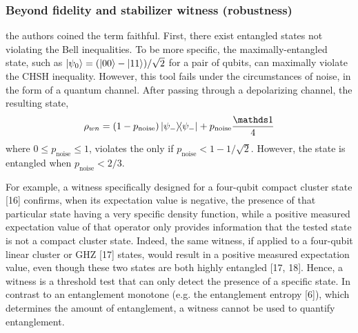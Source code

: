 \documentclass[
aps,
pra,
floatfix,
]{revtex4-2}
\theoremstyle{plain}
\theoremstyle{definition}
\newtheorem{example}{Example}
\newtheorem{remark}{Remark}
\newcommand{\noise}{\text{noise}}
\newcommand{\dm}{\rho}
\begin{document}
\subsubsection{Beyond fidelity and stabilizer witness (robustness)}
the authors coined the term faithful.
	First, there exist entangled states not violating the Bell inequalities. 
	\cite{maTransformingBellInequalities2018}
	To be more speciﬁc, the maximally-entangled state, such as $\ket{\psi_0} = ( \ket{00} - \ket{11} ) / \sqrt{2}$ for a pair of qubits, can maximally violate the CHSH inequality. 
	However, this tool fails under the circumstances of noise, in the form of a quantum channel. After passing through a depolarizing channel, the resulting state,	
	\begin{equation}
		\dm_{wn} = (1-p_{\noise}) \op{\psi_-} + p_{\noise} \frac{\identity}{4}
	\end{equation}
	where $0 \le p_{\noise} \le 1$, violates the  only if $p_{\noise} < 1- 1/ \sqrt{2}$. However, the state is entangled when $p_{\noise} < 2/3$.

	\cite{sciaraUniversalPartiteLevel2019}
	For example, a witness specifically designed for a four-qubit compact cluster state [16] conﬁrms, when its expectation value is negative, the presence of that particular state having a very speciﬁc density function, while a positive measured expectation value of that operator only provides information that the tested state is not a compact cluster state. 
	Indeed, the same witness, if applied to a four-qubit linear cluster or GHZ [17] states, would result in a positive measured expectation value, even though these two states are both highly entangled [17, 18]. 
	Hence, a witness is a threshold test that can only detect the presence of a specific state. 
	In contrast to an entanglement monotone (e.g. the entanglement entropy [6]), which determines the amount of entanglement, a witness cannot be used to quantify entanglement.	
\end{document}
